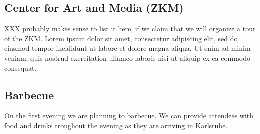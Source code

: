 \begin{multicols}{2}

\subsection{Center for Art and Media (ZKM)}

XXX probably makes sense to list it here, if we claim that we will organize
a tour of the ZKM. Lorem ipsum dolor sit amet, consectetur adipiscing elit, sed do eiusmod tempor incididunt ut labore et dolore magna aliqua. Ut enim ad minim veniam, quis nostrud exercitation ullamco laboris nisi ut aliquip ex ea commodo consequat.

\subsection{Barbecue}

On the first evening we are planning to barbecue. We can provide attendees with
food and drinks troughout the evening as they are arriving in Karlsruhe.



\end{multicols}

